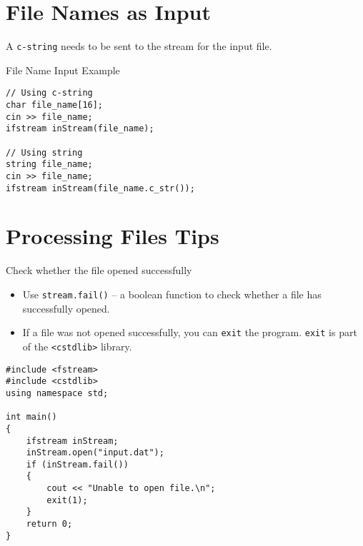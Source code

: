 \documentclass[\main/notes.tex]{subfiles}
\begin{document}
		\pagebreak
		\section{File Names as Input}
			A \texttt{c-string} needs to be sent to the stream for the input file.
			\begin{codebox}{File Name Input Example}
				\begin{verbatim}
// Using c-string
char file_name[16];
cin >> file_name;
ifstream inStream(file_name);

// Using string
string file_name;
cin >> file_name;
ifstream inStream(file_name.c_str());

				\end{verbatim}
			\end{codebox}

		\section{Processing Files Tips}
			\begin{sidenote}{Check whether the file opened successfully}
				\begin{itemize}
					\item Use \texttt{stream.fail()} -- a boolean function to check whether a file has successfully opened.
					\item If a file was not opened successfully, you can \texttt{exit} the program. \texttt{exit} is part of the \texttt{<cstdlib>} library.
				\end{itemize}
				\begin{verbatim}
#include <fstream>
#include <cstdlib>
using namespace std;

int main()
{
    ifstream inStream;
    inStream.open("input.dat");
    if (inStream.fail())
    {
        cout << "Unable to open file.\n";
        exit(1);
    }
    return 0;
}
				\end{verbatim}
			\end{sidenote}
		\pagebreak
\end{document}
